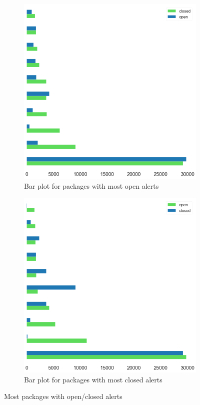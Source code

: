 \begin{figure}[H]
	\begin{subfigure}{0.5\textwidth}
		\centering
		\includegraphics[scale=0.2]{./src/data_analysis/most_open_packages.png}
		\caption{Bar plot for packages with most open alerts}
	\end{subfigure}%
	\begin{subfigure}{0.5\textwidth}
		\centering
		\includegraphics[scale=0.2]{./src/data_analysis/most_closed_packages.png}
		\caption{Bar plot for packages with most closed alerts}
	\end{subfigure}
	\caption{Most packages with open/closed alerts}
	\label{most_open_packages}
\end{figure}


